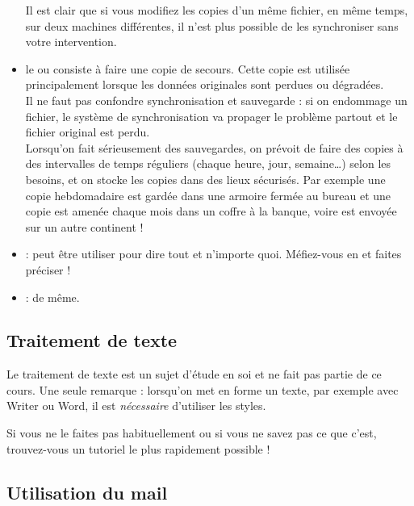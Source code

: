 \documentclass[10pt,a4paper]{report}
\begin{document}
\begin{itemize}
		Il est clair que si vous modifiez les copies d'un même fichier, en même temps, sur deux machines différentes, il n'est plus possible de les synchroniser sans votre intervention.
	\item le  ou  consiste à faire une copie de secours. Cette copie est utilisée principalement lorsque les données originales sont perdues ou dégradées. \\[1ex]
		\attention Il ne faut pas confondre synchronisation et sauvegarde : si on endommage un fichier, le système de synchronisation va propager le problème partout et le fichier original est perdu. \\[1ex]
		Lorsqu'on fait sérieusement des sauvegardes, on prévoit de faire des copies à des intervalles de temps réguliers (chaque heure, jour, semaine\dots) selon les besoins, et on stocke les copies dans des lieux sécurisés. Par exemple une copie hebdomadaire est gardée dans une armoire fermée au bureau et une copie est amenée chaque mois dans un coffre à la banque, voire est envoyée sur un autre continent !
	\item {} : peut être utiliser pour dire tout et n'importe quoi. Méfiez-vous en et faites préciser !
	\item {} : de même.
\end{itemize}



\subsection{Traitement de texte}

Le traitement de texte est un sujet d'étude en soi et ne fait pas partie de ce cours. Une seule remarque : lorsqu'on met en forme un texte, par exemple avec Writer ou Word, il est \emph{nécessaire} d'utiliser les styles.

Si vous ne le faites pas habituellement ou si vous ne savez pas ce que c'est, trouvez-vous un tutoriel le plus rapidement possible !



\subsection{Utilisation du mail}
\end{document}
